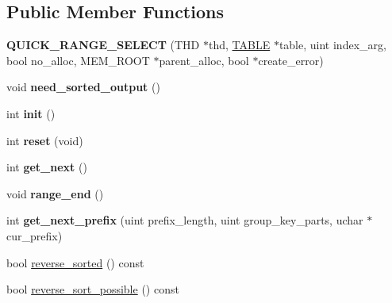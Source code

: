 \subsection*{Public Member Functions}
\begin{DoxyCompactItemize}
\item 
\mbox{\label{classQUICK__RANGE__SELECT_a0c757a3306eb1297619350fa3856535b}} 
{\bfseries Q\+U\+I\+C\+K\+\_\+\+R\+A\+N\+G\+E\+\_\+\+S\+E\+L\+E\+CT} (T\+HD $\ast$thd, \mbox{\hyperlink{structTABLE}{T\+A\+B\+LE}} $\ast$table, uint index\+\_\+arg, bool no\+\_\+alloc, M\+E\+M\+\_\+\+R\+O\+OT $\ast$parent\+\_\+alloc, bool $\ast$create\+\_\+error)
\item 
\mbox{\label{classQUICK__RANGE__SELECT_a9abdf189264e3115fab5be8279362aa0}} 
void {\bfseries need\+\_\+sorted\+\_\+output} ()
\item 
\mbox{\label{classQUICK__RANGE__SELECT_a63e4c70f8eec3a9626fa74887cbf2c25}} 
int {\bfseries init} ()
\item 
\mbox{\label{classQUICK__RANGE__SELECT_a215917aff3a97542d845b8ef387ddef6}} 
int {\bfseries reset} (void)
\item 
\mbox{\label{classQUICK__RANGE__SELECT_ac64f736fb27f43a2e5500825fae4c772}} 
int {\bfseries get\+\_\+next} ()
\item 
\mbox{\label{classQUICK__RANGE__SELECT_a705e1980f6c74787091046c01519f364}} 
void {\bfseries range\+\_\+end} ()
\item 
\mbox{\label{classQUICK__RANGE__SELECT_aca836ce15b7e1f72250beeef64d017cb}} 
int {\bfseries get\+\_\+next\+\_\+prefix} (uint prefix\+\_\+length, uint group\+\_\+key\+\_\+parts, uchar $\ast$cur\+\_\+prefix)
\item 
bool \mbox{\hyperlink{classQUICK__RANGE__SELECT_a4673131942deb7ef48be474cfc4030e9}{reverse\+\_\+sorted}} () const
\item 
bool \mbox{\hyperlink{classQUICK__RANGE__SELECT_a91c847083168b315d7a92d7e2e1d5485}{reverse\+\_\+sort\+\_\+possible}} () const
\item 
\mbox{\label{classQUICK__RANGE__SELECT_a062d36493dcac511e4588df68ccb62e8}} 

\end{DoxyCompactItemize}
